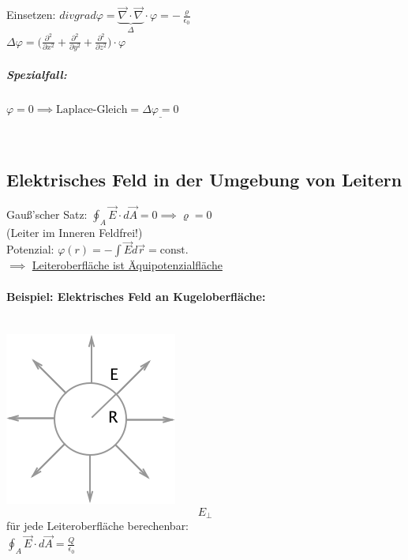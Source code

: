 \documentclass[11pt]{article}
\begin{document}
Einsetzen: $\boxed{div grad \varphi=\underbrace{\vec{\nabla}\cdot\vec{\nabla}}_{\Delta}\cdot\varphi = -\frac{\varrho}{\epsilon_0}}$\\

$ \Delta\varphi=\big(\frac{\partial^2}{\partial x^2}+\frac{\partial^2}{\partial y^2}+\frac{\partial^2}{\partial z^2}\big)\cdot\varphi $\\

\subparagraph{Spezialfall:}

$ \varphi=0
\implies \text{Laplace-Gleich}= \underline{\Delta\varphi=0} $

\hfill\\

\subsection{Elektrisches Feld in der Umgebung von Leitern}

Gauß'scher Satz: $ \oint_{A}\vec{E}\cdot d\vec{A}=0 \implies \varrho=0 $\\
(Leiter im Inneren Feldfrei!)\\

Potenzial: $\varphi(r)=-\int\vec{E}d\vec{r}= \text{const.}$\\

$\implies$ \underline{Leiteroberfläche ist Äquipotenzialfläche}\\

\paragraph{Beispiel: Elektrisches Feld an Kugeloberfläche:}
\hfill\\
\includegraphics{skizzen/14/14_8B0}\\

$$ E_\perp $$ für jede Leiteroberfläche berechenbar:\\

$ \displaystyle\oint_{A}\vec{E}\cdot d\vec{A} = \frac{Q}{\epsilon_0} $\\
\end{document}
